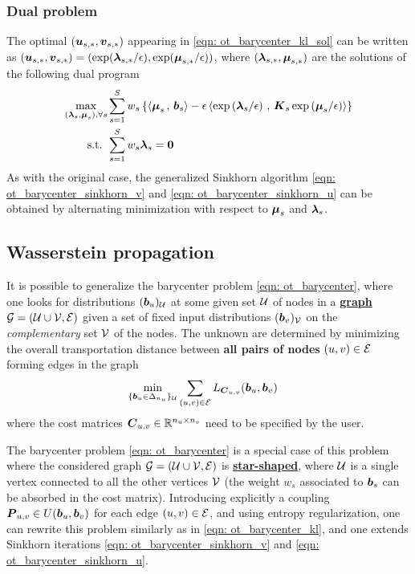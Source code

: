 \documentclass[11pt]{article}
\begin{document}
\subsubsection{Dual problem}
The optimal $(\boldsymbol{u}_{s, *}, \boldsymbol{v}_{s, *})$ appearing in \eqref{eqn: ot_barycenter_kl_sol} can be written as $(\boldsymbol{u}_{s, *}, \boldsymbol{v}_{s, *}) =
(\exp(\boldsymbol{\lambda}_{s, *}/\epsilon), \exp(\boldsymbol{\mu}_{s, *}/\epsilon))$, where $(\boldsymbol{\lambda}_{s, *}, \boldsymbol{\mu}_{s, *})$ are the solutions of the following dual program
\begin{align}
 \max_{(\boldsymbol{\lambda}_s , \boldsymbol{\mu}_s), \forall s}&  \sum_{s=1}^{S}w_s\left\{\left\langle \boldsymbol{\mu}_s\,,\, \boldsymbol{b}_s \right\rangle - \epsilon \left\langle \exp\left(\boldsymbol{\lambda}_s/\epsilon\right)\,,\, \boldsymbol{K}_s\exp\left(\boldsymbol{\mu}_s/\epsilon\right) \right\rangle\right\} \label{eqn: eqn: ot_barycenter_ent_dual} \\
 \text{s.t. }& \sum_{s=1}^{S} w_s \boldsymbol{\lambda}_s = \boldsymbol{0} \nonumber
\end{align} As with the original case, the generalized Sinkhorn algorithm  \eqref{eqn: ot_barycenter_sinkhorn_v} and \eqref{eqn: ot_barycenter_sinkhorn_u} can be obtained by alternating minimization with respect to  $\boldsymbol{\mu}_s$ and $\boldsymbol{\lambda}_s$. 


\subsection{Wasserstein propagation}
It is possible to generalize the barycenter problem \eqref{eqn: ot_barycenter}, where one looks for distributions $(\boldsymbol{b}_u)_{{\mathcal U}}$ at some given set ${\mathcal U}$ of nodes in a \underline{\textbf{graph}} ${\mathcal G} = ({\mathcal U}\cup{\mathcal V}, {\mathcal E})$ given a set of fixed input distributions $(\boldsymbol{b}_v)_{{\mathcal V}}$ on the \emph{complementary} set ${\mathcal V}$ of the nodes.  The unknown are determined by minimizing the overall transportation distance between \textbf{all pairs of nodes} $(u, v) \in {\mathcal E}$ forming edges in the graph
\begin{align*}
\min_{\{\boldsymbol{b}_{u} \in \Delta_{n_u}\}_{{\mathcal U}}}&\sum_{(u, v) \in {\mathcal E}} L_{\boldsymbol{C}_{u, v}}(\boldsymbol{b}_{u}, \boldsymbol{b}_{v}) 
\end{align*} where the cost matrices $\boldsymbol{C}_{u, v} \in {\mathbb R}^{n_u \times n_v}$ need to be specified by the user.

The barycenter problem \eqref{eqn: ot_barycenter} is a special case of this problem where the considered graph ${\mathcal G} = ({\mathcal U}\cup{\mathcal V}, {\mathcal E})$ is \underline{\textbf{star-shaped}}, where ${\mathcal U}$ is a single vertex connected to all the other vertices ${\mathcal V}$ (the weight $w_s$ associated to $\boldsymbol{b}_s$ can be absorbed in the cost matrix). Introducing explicitly a coupling $\boldsymbol{P}_{u,v} \in U(\boldsymbol{b}_u, \boldsymbol{b}_v)$ for each edge $(u, v) \in {\mathcal E}$, and using entropy regularization, one can rewrite this problem similarly as in \eqref{eqn: ot_barycenter_kl}, and one extends Sinkhorn iterations \eqref{eqn: ot_barycenter_sinkhorn_v} and \eqref{eqn: ot_barycenter_sinkhorn_u}.
\end{document}
